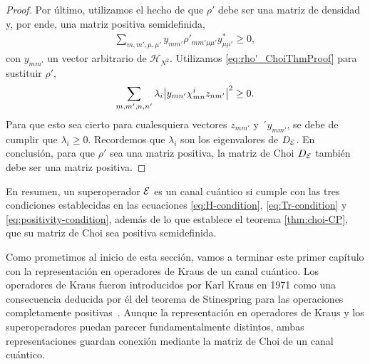 \begin{proof}
Por último, utilizamos el hecho de que $\rho'$ debe ser una matriz 
de densidad y, por ende, una matriz positiva semidefinida,
\begin{align}
\sum_{m,m',\mu,\mu'}
y_{mm'}\rho'_{mm'\mu\mu'}y^*_{\mu\mu'}
\geq0,
\end{align}
con $y_{mm'}$ un vector arbitrario de $\mathcal{H}_{N^2}$.
Utilizamos \eqref{eq:rho'_ChoiThmProof} para sustituir $\rho'$,
\begin{align}
\sum_{m,m',n,n'}\lambda_i\abs{y_{mn'}\chi^i_{mn}z_{nm'}}^2\geq0.
\end{align}
Para que esto sea cierto para cualesquiera vectores $z_{mm'}$ y  
´$y_{mm'}$, se debe de cumplir que $\lambda_i\geq0$. Recordemos
que $\lambda_i$ son los eigenvalores de $D_{\mathcal{E}}$.
En conclusión, para que $\rho'$ sea una matriz positiva, la matriz de Choi 
$D_{\mathcal{E}}$ también debe ser una matriz positiva. 
\end{proof}
En resumen, un superoperador $\mathcal{E}$ es un canal cuántico si 
cumple con las tres condiciones establecidas en las ecuaciones 
\eqref{eq:H-condition}, \eqref{eq:Tr-condition}
y \eqref{eq:positivity-condition}, además de lo que establece 
el teorema \ref{thm:choi-CP}, que su matriz de Choi sea 
positiva semidefinida. 

Como prometimos al inicio de esta sección, vamos a terminar 
este primer capítulo con la representación en operadores de Kraus 
de un canal cuántico. Los operadores de Kraus fueron 
introducidos por Karl Kraus en 1971 como una consecuencia
deducida por él del teorema de Stinespring para las operaciones 
completamente positivas~\cite{bengtsson_zyczkowski_2017}. 
Aunque la representación en operadores de Kraus y los
superoperadores puedan parecer fundamentalmente distintos, 
ambas representaciones guardan conexión mediante 
la matriz de Choi de un canal cuántico.

